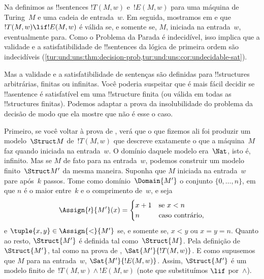 \documentclass[../../../include/open-logic-section]{subfiles}
\begin{document}

\begin{explain}
  Na  definimos as !!{sentence}s $!T(M,w)$ e~$!E(M,w)$
  para uma máquina de Turing~$M$ e uma cadeia de entrada~$w$. Em
  seguida, mostramos em  e
   que $!T(M,w) \lif !E(M,w)$ é válida
  se, e somente se, $M$, iniciada na entrada~$w$, eventualmente para.
  Como o Problema da Parada é indecidível, isso implica que a validade
  e a satisfatibilidade de !!{sentence}s da lógica de primeira ordem
  são indecidíveis
  (\cref{tur:und:uns:thm:decision-prob,tur:und:uns:cor:undecidable-sat}).

  Mas a validade e a satisfatibilidade de sentenças são definidas para
  !!{structure}s arbitrárias, finitas ou infinitas. Você poderia
  suspeitar que é mais fácil decidir se !!a{sentence} é satisfatível em
  uma !!{structure} finita (ou válida em todas as !!{structure}s
  finitas). Podemos adaptar a prova da insolubilidade do problema da
  decisão de modo que ela mostre que não é esse o caso.

  Primeiro, se você voltar à prova de
  , verá que o que fizemos ali foi
  produzir um modelo~$\Struct M$ de~$!T(M,w)$ que descreve exatamente
  o que a máquina~$M$ faz quando iniciada na entrada~$w$.  O domínio
  daquele modelo era~$\Nat$, isto é, infinito. Mas se $M$ de fato para
  na entrada~$w$, podemos construir um modelo finito~$\Struct M'$ da
  mesma maneira. Suponha que $M$ iniciada na entrada~$w$ pare após~$k$
  passos. Tome como domínio~$\Domain{M'}$ o conjunto $\{0, \dots, n\}$,
  em que $n$ é o maior entre~$k$ e o comprimento de~$w$, e seja
  \[
    \Assign{\prime}{M'}(x) = 
    \begin{cases}
      x + 1 &\text{se $x < n$}\\
      n &\text{caso contrário,}
    \end{cases}
  \]
  e $\tuple{x,y} \in \Assign{<}{M'}$ se, e somente se, $x < y$ ou $x =
  y = n$. Quanto ao resto, $\Struct{M'}$ é definida tal como~$\Struct{M}$.
  Pela definição de~$\Struct{M'}$, tal como na prova de
  , $\Sat{M'}{!T(M,w)}$.  E como
  supusemos que $M$ para na entrada~$w$, $\Sat{M'}{!E(M,w)}$. Assim,
  $\Struct{M'}$ é um modelo finito de~$!T(M,w) \land !E(M,w)$ (note
  que substituímos $\lif$ por~$\land$).
  

\end{explain}
\end{document}
